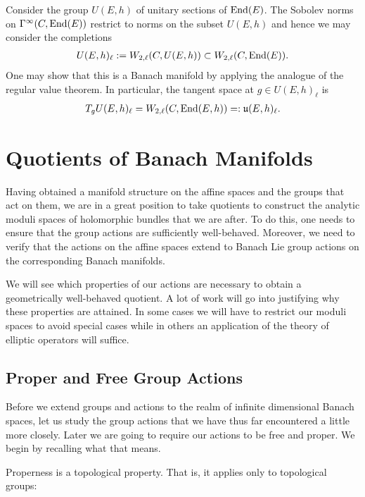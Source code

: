 \documentclass[12pt]{ociamthesis}  %
\begin{document}
\begin{example}
  Consider the group $U(E,h)$ of unitary
  sections of $\operatorname{End}(E)$. The Sobolev norms on $\Gamma^\infty(C,\operatorname{End}(E))$
  restrict to norms on the subset $U(E,h)$ and hence we
  may consider the completions
  \begin{align*}
    U(E,h)_\ell := W_{2,\ell}(C,U(E,h)) \subset W_{2,\ell}(C,\operatorname{End}(E)).
  \end{align*}
  One may show that this is a Banach manifold by applying the
  analogue of the regular value theorem. In particular,
  the tangent space at $g\in U(E,h)_\ell$ is
  \begin{align*}
    T_g U(E,h)_\ell = W_{2,\ell}(C,\operatorname{End}(E,h)) =: \mathfrak u(E,h)_\ell.
  \end{align*}
\end{example}

\section{Quotients of Banach Manifolds}

Having obtained a manifold structure on the affine spaces and the groups
that act on them, we are in a great position to take quotients to construct
the analytic moduli spaces of holomorphic bundles that we are after. To do this,
one needs to ensure that the group actions are sufficiently well-behaved. Moreover,
we need to verify that the actions on the affine spaces extend to Banach Lie group
actions on the corresponding Banach manifolds.

We will see which properties of our actions are necessary to
obtain a geometrically well-behaved quotient. A lot of work will go into justifying why
these properties are attained. In some cases we will have to
restrict our moduli spaces to avoid special cases while in others
an application of the theory of elliptic operators will suffice.

\subsection{Proper and Free Group Actions}

Before we extend groups and actions to the realm of infinite dimensional
Banach spaces, let us study the group actions that we have thus
far encountered a little more closely. Later we are going to require our
actions to be free and proper. We begin by recalling what that means.

Properness is a topological property. That is, it applies only to
topological groups:
\end{document}
